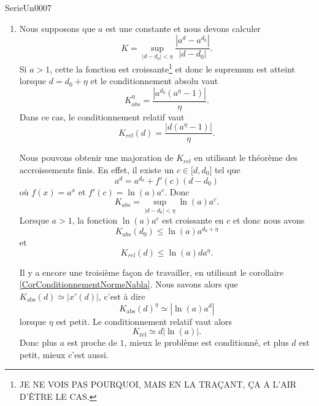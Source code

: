 
\begin{corrige}{SerieUn0007}

	\begin{enumerate}

		\item
			Nous supposons que $a$ est une constante et nous devons calculer
			\begin{equation}
				K=\sup_{| d-d_0 |<\eta}\frac{ | a^d-a^{d_0} | }{ | d-d_0 | }.
			\end{equation}
			Si $a>1$, cette la fonction est croissante\footnote{JE NE VOIS PAS POURQUOI, MAIS EN LA TRAÇANT, ÇA A L'AIR D'ÊTRE LE CAS.} et donc le supremum est atteint lorsque $d=d_0+\eta$ et le conditionnement absolu vaut
			\begin{equation}
				K_{abs}^{\eta}=\frac{ |a^{d_0}(a^{\eta}-1)| }{ \eta }.
			\end{equation}
			Dans ce cas, le conditionnement relatif vaut
			\begin{equation}
				K_{rel}(d)=\frac{ |d(a^{\eta}-1)| }{ \eta }.
			\end{equation}

			Nous pouvons obtenir une majoration de $K_{rel}$ en utilisant le théorème des accroissements finis. En effet, il existe un $c\in\mathopen[ d , d_0 \mathclose]$ tel que
			\begin{equation}
				a^d=a^{d_0}+f'(c)(d-d_0)
			\end{equation}
			où $f(x)=a^x$ et $f'(c)=\ln(a)a^c$. Donc
			\begin{equation}
				K_{abs}=\sup_{| d-d_0 |<\eta}\ln(a)a^c.
			\end{equation}
			Lorsque $a>1$, la fonction $\ln(a)a^c$ est croissante en $c$ et donc nous avons
			\begin{equation}
				K_{abs}(d_0)\leq \ln(a)a^{d_0+\eta}
			\end{equation}
			et
			\begin{equation}
				K_{rel}(d)\leq \ln(a)da^{\eta}.
			\end{equation}

			Il y a encore une troisième façon de travailler, en utilisant le corollaire \ref{CorConditionnementNormeNabla}. Nous savons alors que $K_{\text{abs}}(d)\simeq| x'(d) |$, c'est à dire
			\begin{equation}
				K_{\text{abs}}(d)^{\eta}\simeq| \ln(a)a^d |
			\end{equation}
			lorsque $\eta$ est petit. Le conditionnement relatif vaut alors
			\begin{equation}
				K_{\text{rel}}\simeq d| \ln(a) |.
			\end{equation}
			Donc plus $a$ est proche de $1$, mieux le problème est conditionné, et plus $d$ est petit, mieux c'est aussi.


\end{enumerate}
\end{corrige}
